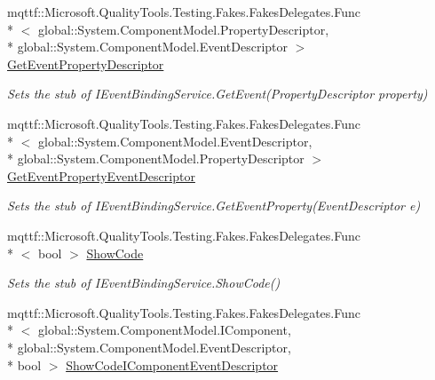 \begin{DoxyCompactItemize}
mqttf\-::\-Microsoft.\-Quality\-Tools.\-Testing.\-Fakes.\-Fakes\-Delegates.\-Func\\*
$<$ global\-::\-System.\-Component\-Model.\-Property\-Descriptor, \\*
global\-::\-System.\-Component\-Model.\-Event\-Descriptor $>$ \hyperlink{class_system_1_1_component_model_1_1_design_1_1_fakes_1_1_stub_i_event_binding_service_af717e528e4d257322255c0a6e12c50c1}{Get\-Event\-Property\-Descriptor}
\begin{DoxyCompactList}\small\item\em Sets the stub of I\-Event\-Binding\-Service.\-Get\-Event(\-Property\-Descriptor property)\end{DoxyCompactList}\item 
mqttf\-::\-Microsoft.\-Quality\-Tools.\-Testing.\-Fakes.\-Fakes\-Delegates.\-Func\\*
$<$ global\-::\-System.\-Component\-Model.\-Event\-Descriptor, \\*
global\-::\-System.\-Component\-Model.\-Property\-Descriptor $>$ \hyperlink{class_system_1_1_component_model_1_1_design_1_1_fakes_1_1_stub_i_event_binding_service_a539d00c00f5a87819514aa4b5b7bc947}{Get\-Event\-Property\-Event\-Descriptor}
\begin{DoxyCompactList}\small\item\em Sets the stub of I\-Event\-Binding\-Service.\-Get\-Event\-Property(\-Event\-Descriptor e)\end{DoxyCompactList}\item 
mqttf\-::\-Microsoft.\-Quality\-Tools.\-Testing.\-Fakes.\-Fakes\-Delegates.\-Func\\*
$<$ bool $>$ \hyperlink{class_system_1_1_component_model_1_1_design_1_1_fakes_1_1_stub_i_event_binding_service_a83adfa25a76ad4d628cec51592cec090}{Show\-Code}
\begin{DoxyCompactList}\small\item\em Sets the stub of I\-Event\-Binding\-Service.\-Show\-Code()\end{DoxyCompactList}\item 
mqttf\-::\-Microsoft.\-Quality\-Tools.\-Testing.\-Fakes.\-Fakes\-Delegates.\-Func\\*
$<$ global\-::\-System.\-Component\-Model.\-I\-Component, \\*
global\-::\-System.\-Component\-Model.\-Event\-Descriptor, \\*
bool $>$ \hyperlink{class_system_1_1_component_model_1_1_design_1_1_fakes_1_1_stub_i_event_binding_service_a83e763ecbb9331896d2846ef0342cadc}{Show\-Code\-I\-Component\-Event\-Descriptor}

\end{DoxyCompactItemize}
